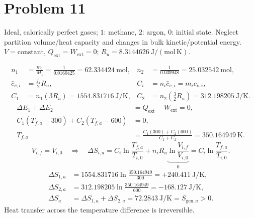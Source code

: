 \section*{Problem 11}
Ideal, calorically perfect gases; $1$: methane, $2$: argon, $0$: initial state.
Neglect partition volume/heat capacity and changes in bulk kinetic/potential energy.
$V=\text{constant}$, $Q_{\mathrm{ext}}=W_{\mathrm{ext}}=0$;
$R_u=8.3144626~\mathrm{J/(mol\,K)}$.

\begin{align*}
n_1&=\frac{m_1}{M_1}=\frac{1}{0.0160425}=62.334424~\mathrm{mol},
&n_2&=\frac{1}{0.039948}=25.032542~\mathrm{mol},\\
\bar c_{v,i}&=\frac{f_i}{2}R_u,
&C_i&=n_i\bar c_{v,i}=m_ic_{v,i},\\
C_1&=n_1(3R_u)=1554.831716~\mathrm{J/K},
&C_2&=n_2\left(\frac32R_u\right)=312.198205~\mathrm{J/K}.
\end{align*}
\begin{align*}
\Delta E_1+\Delta E_2&=Q_{\mathrm{ext}}-W_{\mathrm{ext}}=0,\\
C_1(T_{f,a}-300)+C_2(T_{f,a}-600)&=0,\\
T_{f,a}&=\frac{C_1(300)+C_2(600)}{C_1+C_2}
=\boxed{350.164949~\mathrm{K}}.
\end{align*}
\[
V_{i,f}=V_{i,0}
\quad\Longrightarrow\quad
\Delta S_{i,a}=C_i\ln\frac{T_{f,a}}{T_{i,0}}
+n_iR_u\underbrace{\ln\frac{V_{i,f}}{V_{i,0}}}_{0}
=C_i\ln\frac{T_{f,a}}{T_{i,0}}.
\]
\begin{align*}
\Delta S_{1,a}&=1554.831716\ln\frac{350.164949}{300}
=\boxed{+240.411~\mathrm{J/K}},\\
\Delta S_{2,a}&=312.198205\ln\frac{350.164949}{600}
=\boxed{-168.127~\mathrm{J/K}},\\
\Delta S_a&=\Delta S_{1,a}+\Delta S_{2,a}
=\boxed{72.2843~\mathrm{J/K}}=S_{\mathrm{gen},a}>0.
\end{align*}
Heat transfer across the temperature difference is irreversible.

